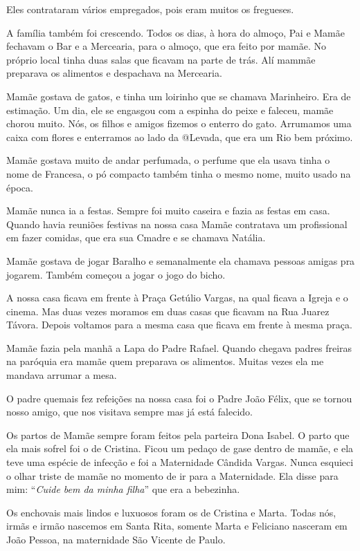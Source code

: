 \documentclass[
  brazil,
  a6paper,
  oneside,
  landscape,
  14pt]{scrbook}
\begin{document}
Eles contrataram vários empregados, pois eram muitos os fregueses.

A família também foi crescendo. Todos os dias, à hora do almoço, Pai e
Mamãe fechavam o Bar e a Mercearia, para o almoço, que era feito por
mamãe. No próprio local tinha duas salas que ficavam na parte de trás.
Alí mammãe preparava os alimentos e despachava na Mercearia.

Mamãe gostava de gatos, e tinha um loirinho que se chamava Marinheiro.
Era de estimação. Um dia, ele se engasgou com a espinha do peixe e
faleceu, mamãe chorou muito. Nós, os filhos e amigos fizemos o enterro
do gato. Arrumamos uma caixa com flores e enterramos ao lado da @Levada,
que era um Rio bem próximo.

Mamãe gostava muito de andar perfumada, o perfume que ela usava tinha o
nome de Francesa, o pó compacto também tinha o mesmo nome, muito usado
na época.

Mamãe nunca ia a festas. Sempre foi muito caseira e fazia as festas em
casa. Quando havia reuniões festivas na nossa casa Mamãe contratava um
profissional em fazer comidas, que era sua Cmadre e se chamava Natália.

Mamãe gostava de jogar Baralho e semanalmente ela chamava pessoas amigas
pra jogarem. Também começou a jogar o jogo do bicho.

A nossa casa ficava em frente à Praça Getúlio Vargas, na qual ficava a
Igreja e o cinema. Mas duas vezes moramos em duas casas que ficavam na
Rua Juarez Távora. Depois voltamos para a mesma casa que ficava em
frente à mesma praça.

Mamãe fazia pela manhã a Lapa do Padre Rafael. Quando chegava padres
freiras na paróquia era mamãe quem preparava os alimentos. Muitas vezes
ela me mandava arrumar a mesa.

O padre quemais fez refeições na nossa casa foi o Padre João Félix, que
se tornou nosso amigo, que nos visitava sempre mas já está falecido.

Os partos de Mamãe sempre foram feitos pela parteira Dona Isabel. O
parto que ela mais sofrel foi o de Cristina. Ficou um pedaço de gase
dentro de mamãe, e ela teve uma espécie de infecção e foi a Maternidade
Cândida Vargas. Nunca esquieci o olhar triste de mamãe no momento de ir
para a Maternidade. Ela disse para mim: ``\emph{Cuide bem da minha
filha}'' que era a bebezinha.

Os enchovais mais lindos e luxuosos foram os de Cristina e Marta. Todas
nós, irmãs e irmão nascemos em Santa Rita, somente Marta e Feliciano
nasceram em João Pessoa, na maternidade São Vicente de Paulo.
\end{document}
